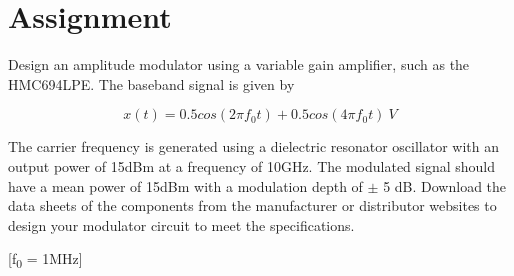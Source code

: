\section{Assignment}

Design an amplitude modulator using a variable gain amplifier, such as the HMC694LPE. The baseband signal is given by

\begin{equation}\label{message}
    x(t) = 0.5cos(2 \pi f_0 t) + 0.5cos(4 \pi f_0t)\ V
\end{equation}


The carrier frequency is generated using a dielectric resonator oscillator with an output power of 15dBm at a frequency of 10GHz. The modulated signal should have a mean power of 15dBm with a modulation depth of $\pm$ 5 dB. Download the data sheets of the components from the manufacturer or distributor websites to design your modulator circuit to meet the specifications.

[f\textsubscript{0} = 1MHz]